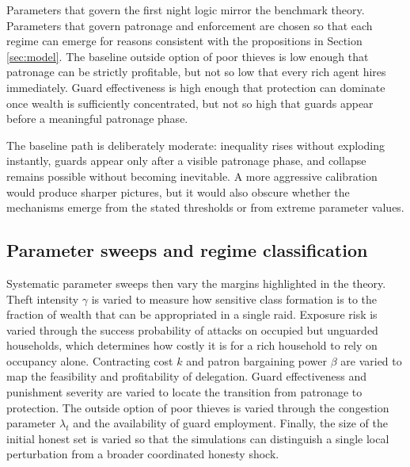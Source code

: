 Parameters that govern the first night logic mirror the benchmark theory. Parameters that govern patronage and enforcement are chosen so that each regime can emerge for reasons consistent with the propositions in Section \ref{sec:model}. The baseline outside option of poor thieves is low enough that patronage can be strictly profitable, but not so low that every rich agent hires immediately. Guard effectiveness is high enough that protection can dominate once wealth is sufficiently concentrated, but not so high that guards appear before a meaningful patronage phase.

The baseline path is deliberately moderate: inequality rises without exploding instantly, guards appear only after a visible patronage phase, and collapse remains possible without becoming inevitable. A more aggressive calibration would produce sharper pictures, but it would also obscure whether the mechanisms emerge from the stated thresholds or from extreme parameter values.

\subsection{Parameter sweeps and regime classification}

Systematic parameter sweeps then vary the margins highlighted in the theory. Theft intensity $\gamma$ is varied to measure how sensitive class formation is to the fraction of wealth that can be appropriated in a single raid. Exposure risk is varied through the success probability of attacks on occupied but unguarded households, which determines how costly it is for a rich household to rely on occupancy alone. Contracting cost $k$ and patron bargaining power $\beta$ are varied to map the feasibility and profitability of delegation. Guard effectiveness and punishment severity are varied to locate the transition from patronage to protection. The outside option of poor thieves is varied through the congestion parameter $\lambda_t$ and the availability of guard employment. Finally, the size of the initial honest set is varied so that the simulations can distinguish a single local perturbation from a broader coordinated honesty shock.

